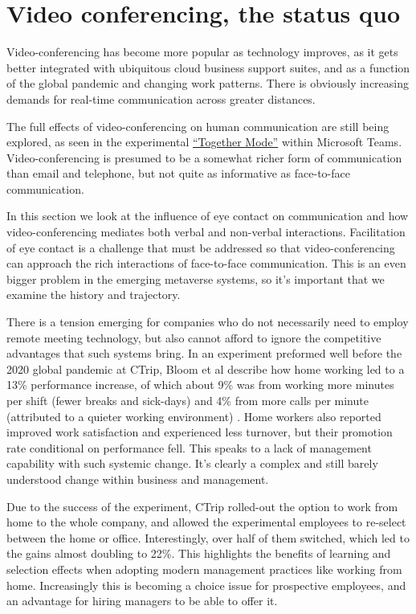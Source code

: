 
\section{Video conferencing, the status quo}
Video-conferencing has become more popular as technology improves, as it gets better integrated with ubiquitous cloud business support suites, and as a function of the global pandemic and changing work patterns. There is obviously increasing demands for real-time communication across greater distances.\par
The full effects of video-conferencing on human communication are still being explored, as seen in the experimental \href{https://news.microsoft.com/innovation-stories/microsoft-teams-together-mode/}{``Together Mode''} within Microsoft Teams. Video-conferencing is presumed to be a somewhat richer form of communication than email and telephone, but not quite as informative as face-to-face communication. \par
In this section we look at the influence of eye contact on communication and how video-conferencing mediates both verbal and non-verbal interactions. Facilitation of eye contact is a challenge that must be addressed so that video-conferencing can approach the rich interactions of face-to-face communication. This is an even bigger problem in the emerging metaverse systems, so it's important that we examine the history and trajectory.\par
There is a tension emerging for companies who do not necessarily need to employ remote meeting technology, but also cannot afford to ignore the competitive advantages that such systems bring. In an experiment preformed well before the 2020 global pandemic at CTrip, Bloom et al describe how home working led to a 13\% performance increase, of which about 9\% was from working more minutes per shift (fewer breaks and sick-days) and 4\% from more calls per minute (attributed to a quieter working environment) \cite{Bloom2015}. Home workers also reported improved work satisfaction and experienced less turnover, but their promotion rate conditional on performance fell. This speaks to a lack of management capability with such systemic change. It's clearly a complex and still barely understood change within business and management. \par
Due to the success of the experiment, CTrip rolled-out the option to work from home to the whole company, and allowed the experimental employees to re-select between the home or office. Interestingly, over half of them switched, which led to the gains almost doubling to 22\%. This highlights the benefits of learning and selection effects when adopting modern management practices like working from home. Increasingly this is becoming a choice issue for prospective employees, and an advantage for hiring managers to be able to offer it.\par
